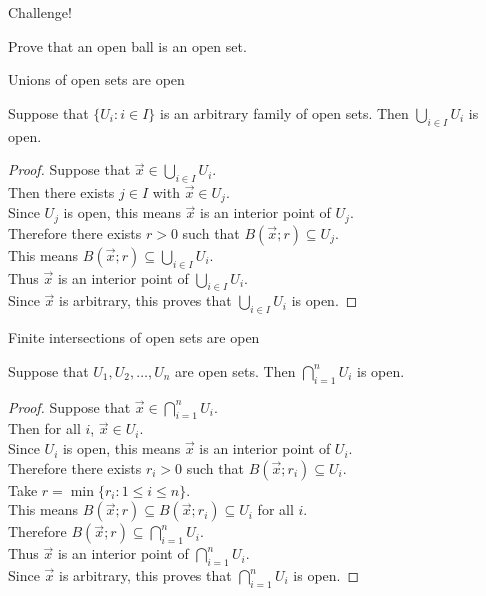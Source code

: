 \documentclass{beamer}
\begin{document}
\begin{frame}{Challenge!}
\begin{prob}
Prove that an open ball is an open set.
\end{prob}
\end{frame}

\begin{frame}{Unions of open sets are open}
\begin{thm}
Suppose that $\{U_i: i\in I\}$ is an arbitrary family of open sets.
Then $\bigcup_{i\in I} U_i$ is open.
\end{thm}
\pause
\begin{proof}
\pause
Suppose that $\vec x\in \bigcup_{i\in I} U_i$.\\
\pause
Then there exists $j\in I$ with $\vec x\in U_j$.\\
\pause
Since $U_j$ is open, this means $\vec x$ is an interior point of $U_j$.\\
\pause
Therefore there exists $r>0$ such that $B(\vec x; r)\subseteq U_j$.\\
\pause
This means $B(\vec x; r)\subseteq \bigcup_{i\in I} U_i$.\\
\pause
Thus $\vec x$ is an interior point of $\bigcup_{i\in I} U_i$.\\
\pause
Since $\vec x$ is arbitrary, this proves that $\bigcup_{i\in I} U_i$ is open.
\end{proof}
\end{frame}

\begin{frame}{Finite intersections of open sets are open}
\begin{thm}
Suppose that $U_1,U_2,\dots,U_n$ are open sets.
Then $\bigcap_{i=1}^n U_i$ is open.
\end{thm}
\pause
\begin{proof}
\pause
Suppose that $\vec x\in \bigcap_{i=1}^n U_i$.\\
\pause
Then for all $i$, $\vec x\in U_i$.\\
\pause
Since $U_i$ is open, this means $\vec x$ is an interior point of $U_i$.\\
\pause
Therefore there exists $r_i>0$ such that $B(\vec x; r_i)\subseteq U_i$.\\
\pause
Take $r = \min\{r_i: 1\leq i \leq n\}$.\\
\pause
This means $B(\vec x; r)\subseteq B(\vec x; r_i)\subseteq U_i$ for all $i$.\\
\pause
Therefore $B(\vec x; r)\subseteq \bigcap_{i=1}^n U_i$.\\
\pause
Thus $\vec x$ is an interior point of $\bigcap_{i=1}^n U_i$.\\
\pause
Since $\vec x$ is arbitrary, this proves that $\bigcap_{i=1}^n U_i$ is open.
\end{proof}
\end{frame}
\end{document}
